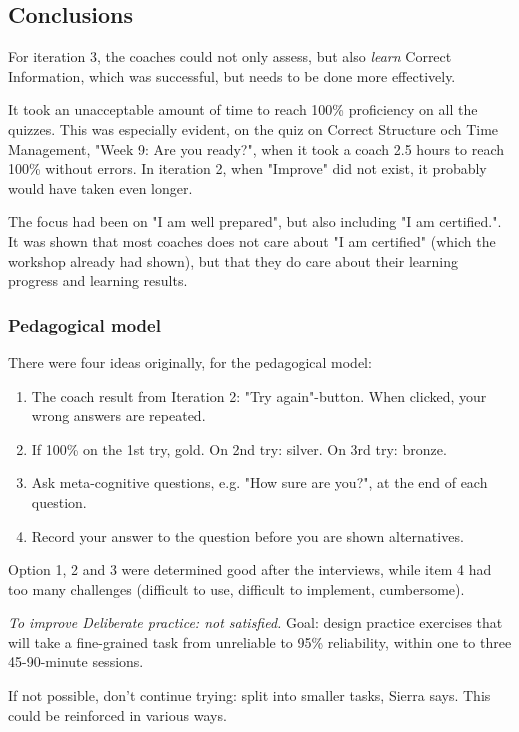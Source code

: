 \subsection{Conclusions}

  For iteration 3, the coaches could not only assess, but also \textit{learn} Correct Information, which was successful, but needs to be done more effectively.

  It took an unacceptable amount of time to reach 100\% proficiency on all the quizzes. This was especially evident, on the quiz on Correct Structure och Time Management, "Week 9: Are you ready?", when it took a coach 2.5 hours to reach 100\% without errors. In iteration 2, when "Improve" did not exist, it probably would have taken even longer.

  The focus had been on "I am well prepared", but also including "I am certified.". It was shown that most coaches does not care about "I am certified" (which the workshop already had shown), but that they do care about their learning progress and learning results.

  \subsubsection{Pedagogical model}
  There were four ideas originally, for the pedagogical model:

  \begin{enumerate}
  \item The coach result from Iteration 2: "Try again"-button. When clicked, your wrong answers are repeated.
  \item If 100\% on the 1st try, gold. On 2nd try: silver. On 3rd try: bronze.
  \item Ask meta-cognitive questions, e.g. "How sure are you?", at the end of each question.
  \item Record your answer to the question before you are shown alternatives.
  \end{enumerate}

  Option 1, 2 and 3 were determined good after the interviews, while item 4 had too many challenges (difficult to use, difficult to implement, cumbersome).

  \textit{To improve Deliberate practice: not satisfied.}
  Goal: design practice exercises that will take a fine-grained task from unreliable to 95\% reliability, within one to three 45-90-minute sessions.

  If not possible, don't continue trying: split into smaller tasks, Sierra says. This could be reinforced in various ways.

